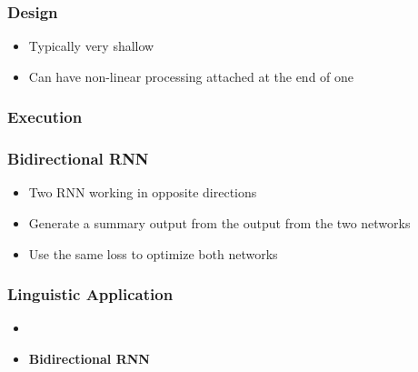     \subsubsection{Design}

      \begin{itemize}
        \item Typically very shallow
        \item Can have non-linear processing attached at the end of one
      \end{itemize}

    \subsubsection{Execution}

    \subsubsection{Bidirectional RNN}

      \begin{itemize}
        \item Two RNN working in opposite directions
        \item Generate a summary output from the output from the two networks
        \item Use the same loss to optimize both networks
      \end{itemize}

    \subsubsection{Linguistic Application}

      \begin{itemize}
        \item
        \item \textbf{Bidirectional RNN}
      \end{itemize}